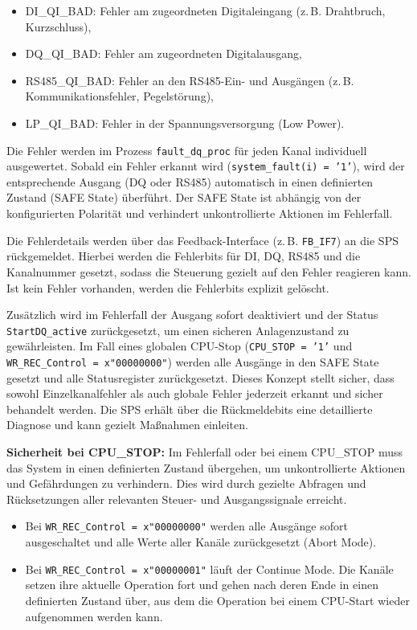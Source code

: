 \begin{itemize}
    \item DI\_QI\_BAD: Fehler am zugeordneten Digitaleingang (z.\,B. Drahtbruch, Kurzschluss),
    \item DQ\_QI\_BAD: Fehler am zugeordneten Digitalausgang,
    \item RS485\_QI\_BAD: Fehler an den RS485-Ein- und Ausgängen (z.\,B. Kommunikationsfehler, Pegelstörung),
    \item LP\_QI\_BAD: Fehler in der Spannungsversorgung (Low Power).
\end{itemize}

Die Fehler werden im Prozess \texttt{fault\_dq\_proc} für jeden Kanal individuell ausgewertet.  
Sobald ein Fehler erkannt wird (\texttt{system\_fault(i) = '1'}), wird der entsprechende Ausgang (DQ oder RS485) automatisch in einen definierten Zustand (SAFE State) überführt. Der SAFE State ist abhängig von der konfigurierten Polarität und verhindert unkontrollierte Aktionen im Fehlerfall.

Die Fehlerdetails werden über das Feedback-Interface (z.\,B. \texttt{FB\_IF7}) an die SPS rückgemeldet. Hierbei werden die Fehlerbits für DI, DQ, RS485 und die Kanalnummer gesetzt, sodass die Steuerung gezielt auf den Fehler reagieren kann. Ist kein Fehler vorhanden, werden die Fehlerbits explizit gelöscht.

Zusätzlich wird im Fehlerfall der Ausgang sofort deaktiviert und der Status \texttt{StartDQ\_active} zurückgesetzt, um einen sicheren Anlagenzustand zu gewährleisten. Im Fall eines globalen CPU-Stop (\texttt{CPU\_STOP = '1'} und \texttt{WR\_REC\_Control = x"00000000"}) werden alle Ausgänge in den SAFE State gesetzt und alle Statusregister zurückgesetzt.  
Dieses Konzept stellt sicher, dass sowohl Einzelkanalfehler als auch globale Fehler jederzeit erkannt und sicher behandelt werden. Die SPS erhält über die Rückmeldebits eine detaillierte Diagnose und kann gezielt Maßnahmen einleiten.

\textbf{Sicherheit bei CPU\_STOP:}  
Im Fehlerfall oder bei einem CPU\_STOP muss das System in einen definierten Zustand übergehen, um unkontrollierte Aktionen und Gefährdungen zu verhindern. Dies wird durch gezielte Abfragen und Rücksetzungen aller relevanten Steuer- und Ausgangssignale erreicht.

\begin{itemize}
    \item Bei \texttt{WR\_REC\_Control = x"00000000"} werden alle Ausgänge sofort ausgeschaltet und alle Werte aller Kanäle zurückgesetzt (Abort Mode).
    \item Bei \texttt{WR\_REC\_Control = x"00000001"} läuft der Continue Mode. Die Kanäle setzen ihre aktuelle Operation fort und gehen nach deren Ende in einen definierten Zustand über, aus dem die Operation bei einem CPU-Start wieder aufgenommen werden kann.
\end{itemize}

